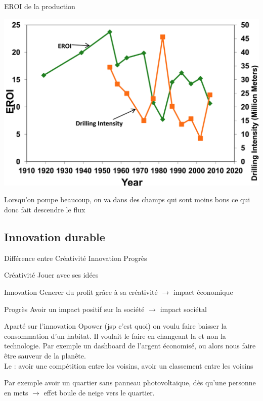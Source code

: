 \begin{parag}{EROI de la production}
	\begin{center}
	    
	\includegraphics[scale=0.2]{72025-09-23.png}
	\end{center}
	
	Lorsqu'on pompe beaucoup, on va dans des champs qui sont moins bons ce qui donc fait descendre le flux
    
\end{parag}


\subsection{Innovation durable}

\begin{parag}{Différence entre Créativité Innovation Progrès}
	\begin{subparag}{Créativité}
	    Jouer avec ses idées
	\end{subparag}
	\begin{subparag}{Innovation}
	    Generer du profit grâce à sa  créativité $\to$ impact économique
	\end{subparag}
	\begin{subparag}{Progrès}
	    Avoir un impact positif sur la société $\to$ impact sociétal
	\end{subparag}
	\begin{subparag}{Aparté sur l'innovation}
	    Opower (jsp c'est quoi) on voulu faire baisser la consommation d'un habitat. Il voulait le faire en changeant la  et non la technologie. Par exemple un dashboard de l'argent économisé, ou alors nous faire être sauveur de la planête.\\
	    Le : avoir une compétition entre les voisins, avoir un classement entre les voisins
	\end{subparag}
	\begin{framedremark}
	Par exemple avoir un quartier sans panneau photovoltaique, dès qu'une personne en mets $\to $ effet boule de neige vers le quartier.
	\end{framedremark}
\end{parag}


